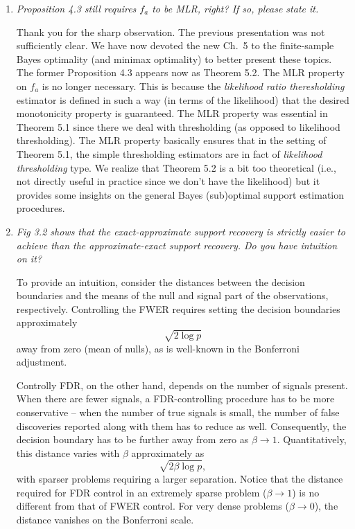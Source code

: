 \documentclass[11pt]{article}
\begin{document}
\begin{enumerate}
    \item {\em Proposition 4.3 still requires $f_a$ to be MLR, right? If so, please state it.}
    
    Thank you for the sharp observation.  The previous presentation was not sufficiently clear.  We have now devoted the new Ch.\ 5 to the
    finite-sample Bayes optimality (and minimax optimality) to better present these topics.  
    The former Proposition 4.3 appears now as Theorem 5.2.  The MLR property on $f_a$
    is no longer necessary.  This is because the {\em likelihood ratio theresholding} estimator is defined in such a way (in terms of the likelihood) that
    the desired monotonicity property is guaranteed.  The MLR property was essential in Theorem 5.1 since there we deal with thresholding (as opposed to
    likelihood thresholding). The MLR property basically ensures that in the setting of Theorem 5.1, the simple thresholding estimators are in fact of
    {\em likelihood thresholding} type.  We realize that Theorem 5.2 is a bit too theoretical (i.e., not directly useful in practice since we don't have the 
    likelihood) but it provides some insights on
    the general Bayes (sub)optimal support estimation procedures.
   
    \item  {\em Fig 3.2 shows that the exact-approximate support recovery is strictly easier to achieve than the approximate-exact support recovery. Do you have intuition on it?}

    To provide an intuition, consider the distances between the decision boundaries and the means of the null and signal part of the observations, respectively.
    Controlling the FWER requires setting the decision boundaries approximately 
    \begin{equation} \label{FWER}
    \sqrt{2\log{p}}
    \end{equation}
    away from zero (mean of nulls), as is well-known in the Bonferroni adjustment.
    
    Controlly FDR, on the other hand, depends on the number of signals present.
    When there are fewer signals, a FDR-controlling procedure has to be more conservative -- when the number of true signals is small, the number of false discoveries reported along with them has to reduce as well.
    Consequently, the decision boundary has to be further away from zero as $\beta\to1$.
    Quantitatively, this distance varies with $\beta$ approximately as
    \begin{equation} \label{FDR}
    \sqrt{2\beta\log{p}},
    \end{equation}
    with sparser problems requiring a larger separation. 
    Notice that the distance required for FDR control in an extremely sparse problem ($\beta\to1$) is no different from that of FWER control.
    For very dense problems ($\beta\to0$), the distance vanishes on the Bonferroni scale.
    

\end{enumerate}
\end{document}
